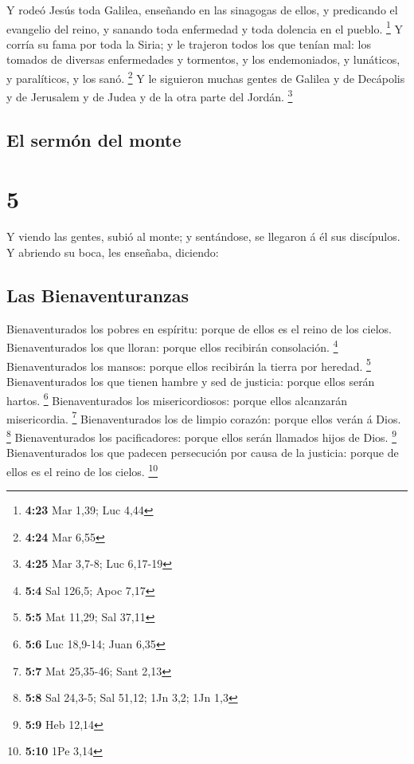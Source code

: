  Y rodeó Jesús toda Galilea, enseñando en las sinagogas de
ellos, y predicando el evangelio del reino, y sanando toda enfermedad y
toda dolencia en el pueblo. \footnote{\textbf{4:23} Mar 1,39; Luc 4,44}
 Y corría su fama por toda la Siria; y le trajeron todos
los que tenían mal: los tomados de diversas enfermedades y tormentos, y
los endemoniados, y lunáticos, y paralíticos, y los sanó. \footnote{\textbf{4:24}
  Mar 6,55}  Y le siguieron muchas gentes de Galilea y de
Decápolis y de Jerusalem y de Judea y de la otra parte del Jordán.
\footnote{\textbf{4:25} Mar 3,7-8; Luc 6,17-19}

\hypertarget{el-sermuxf3n-del-monte}{%
\subsection{El sermón del monte}\label{el-sermuxf3n-del-monte}}

\hypertarget{section-4}{%
\section{5}\label{section-4}}

 Y viendo las gentes, subió al monte; y sentándose, se
llegaron á él sus discípulos.  Y abriendo su boca, les
enseñaba, diciendo:

\hypertarget{las-bienaventuranzas}{%
\subsection{Las Bienaventuranzas}\label{las-bienaventuranzas}}

 Bienaventurados los pobres en espíritu: porque de ellos es
el reino de los cielos.  Bienaventurados los que lloran:
porque ellos recibirán consolación. \footnote{\textbf{5:4} Sal 126,5;
  Apoc 7,17}  Bienaventurados los mansos: porque ellos
recibirán la tierra por heredad. \footnote{\textbf{5:5} Mat 11,29; Sal
  37,11}  Bienaventurados los que tienen hambre y sed de
justicia: porque ellos serán hartos. \footnote{\textbf{5:6} Luc 18,9-14;
  Juan 6,35}  Bienaventurados los misericordiosos: porque
ellos alcanzarán misericordia. \footnote{\textbf{5:7} Mat 25,35-46; Sant
  2,13}  Bienaventurados los de limpio corazón: porque ellos
verán á Dios. \footnote{\textbf{5:8} Sal 24,3-5; Sal 51,12; 1Jn 3,2; 1Jn
  1,3}  Bienaventurados los pacificadores: porque ellos
serán llamados hijos de Dios. \footnote{\textbf{5:9} Heb 12,14}
 Bienaventurados los que padecen persecución por causa de
la justicia: porque de ellos es el reino de los cielos. \footnote{\textbf{5:10}
  1Pe 3,14}


